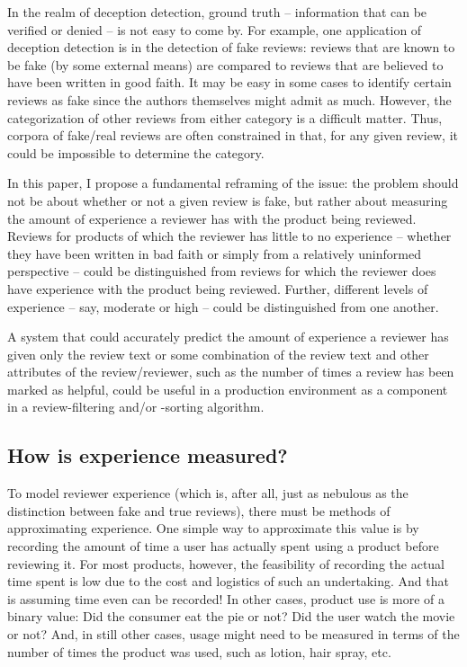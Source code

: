 \documentclass[9pt]{article}
\begin{document}
In the realm of deception detection, ground truth -- information that can be verified or denied -- is not easy to come by. For example, one application of deception detection is in the detection of fake reviews: reviews that are known to be fake (by some external means) are compared to reviews that are believed to have been written in good faith. It may be easy in some cases to identify certain reviews as fake since the authors themselves might admit as much. However, the categorization of other reviews from either category is a difficult matter. Thus, corpora of fake/real reviews are often constrained in that, for any given review, it could be impossible to determine the category.

In this paper, I propose a fundamental reframing of the issue: the problem should not be about whether or not a given review is fake, but rather about measuring the amount of experience a reviewer has with the product being reviewed. Reviews for products of which the reviewer has little to no experience -- whether they have been written in bad faith or simply from a relatively uninformed perspective -- could be distinguished from reviews for which the reviewer does have experience with the product being reviewed. Further, different levels of experience -- say, moderate or high -- could be distinguished from one another.

A system that could accurately predict the amount of experience a reviewer has given only the review text or some combination of the review text and other attributes of the review/reviewer, such as the number of times a review has been marked as helpful, could be useful in a production environment as a component in a review-filtering and/or -sorting algorithm.

\subsection{How is experience measured?}
\label{ssec:experience}

To model reviewer experience (which is, after all, just as nebulous as the distinction between fake and true reviews), there must be methods of approximating experience. One simple way to approximate this value is by recording the amount of time a user has actually spent using a product before reviewing it. For most products, however, the feasibility of recording the actual time spent is low due to the cost and logistics of such an undertaking. And that is assuming time even can be recorded! In other cases, product use is more of a binary value: Did the consumer eat the pie or not? Did the user watch the movie or not? And, in still other cases, usage might need to be measured in terms of the number of times the product was used, such as lotion, hair spray, etc.
\end{document}
